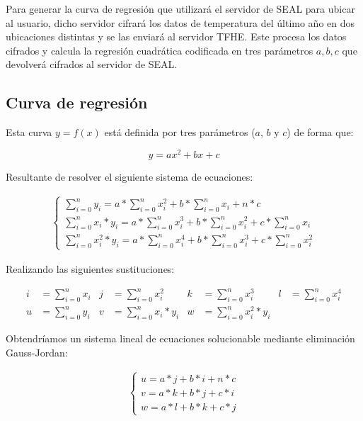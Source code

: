 Para generar la curva de regresión que utilizará el servidor de SEAL para ubicar al usuario, dicho servidor cifrará los datos de temperatura del último año en dos ubicaciones distintas y se las enviará al servidor TFHE. Este procesa los datos cifrados y calcula la regresión cuadrática codificada en tres parámetros $a, b, c$ que devolverá cifrados al servidor de SEAL.

\subsection{Curva de regresión}

Esta curva $ y = f(x) $ está definida por tres parámetros ($a$, $b$ y $c$) de forma que:

\[ y = ax^2 + bx + c \]

Resultante de resolver el siguiente sistema de ecuaciones:

\begin{gather*}
    \begin{cases}
        \sum_{i=0}^n y_i = a*\sum_{i=0}^n x_i^2 + b*\sum_{i=0}^n x_i + n*c \\
        \sum_{i=0}^n x_i * y_i = a*\sum_{i=0}^n x_i^3 + b*\sum_{i=0}^n x_i^2 + c*\sum_{i=0}^n x_i \\
        \sum_{i=0}^n x_i^2 * y_i = a*\sum_{i=0}^n x_i^4 + b*\sum_{i=0}^n x_i^3 + c*\sum_{i=0}^n x_i^2
    \end{cases}
\end{gather*}

Realizando las siguientes sustituciones:

\begin{align*}
    i &= \sum_{i=0}^n x_i & j &= \sum_{i=0}^n x_i^2 & k &= \sum_{i=0}^n x_i^3 & l &= \sum_{i=0}^n x_i^4 \\
    u &= \sum_{i=0}^n y_i & v &= \sum_{i=0}^n x_i * y_i & w &= \sum_{i=0}^n x_i^2 * y_i
\end{align*}

Obtendríamos un sistema lineal de ecuaciones solucionable mediante eliminación Gauss-Jordan:

\begin{gather*}
    \begin{cases}
        u = a*j + b*i + n*c \\
        v = a*k + b*j + c*i \\
        w = a*l + b*k + c*j
    \end{cases}
\end{gather*}

